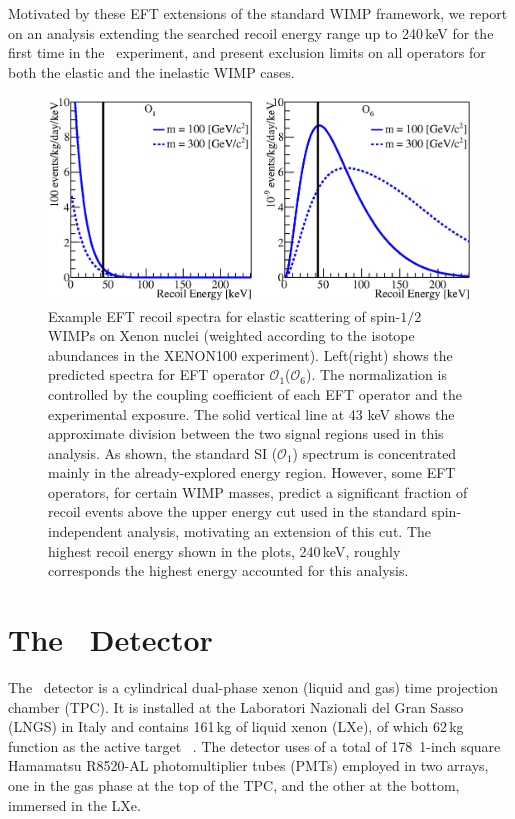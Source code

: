 Motivated by these EFT extensions of the standard WIMP framework, we report on an analysis extending the searched recoil energy range up to 240\,keV for the first time in the \Xehund\ experiment, and present exclusion limits on all operators for both the elastic and the inelastic WIMP cases.     


\begin{figure}[t!]
\centerline{\includegraphics[width=1.\linewidth]{Figures/drdeO1O6.eps}}
\caption{Example EFT recoil spectra for elastic scattering of spin-$1/2$ WIMPs on Xenon nuclei (weighted according to the isotope abundances in the XENON100 experiment). Left(right) shows the predicted spectra for EFT operator $\mathcal{O}_1$($\mathcal{O}_6$). The normalization is controlled by the coupling coefficient of each EFT operator and the experimental exposure. The solid vertical line at 43 keV shows the approximate division between the two signal regions used in this analysis. As shown, the standard SI ($\mathcal{O}_1$) spectrum is concentrated mainly in the already-explored energy region. However, some EFT operators, for certain WIMP masses, predict a significant fraction of recoil events above the upper energy cut used in the standard spin-independent analysis, motivating an extension of this cut. The highest recoil energy shown in the plots, 240\,keV, roughly corresponds the highest energy accounted for this analysis.}
\label{fig:dRdE}
\end{figure}

\section{The \Xehund\  Detector}
The \Xehund\ detector is a cylindrical %
dual-phase xenon (liquid and gas) time projection chamber (TPC). It is installed at the Laboratori Nazionali del Gran Sasso (LNGS) in Italy
and contains 161\,kg of liquid xenon (LXe), of which 62\,kg function as the active target ~\cite{xe100_instr2012}. 
The detector uses of a total of 178~1-inch square Hamamatsu R8520-AL photomultiplier tubes (PMTs) employed in two arrays, one in the gas phase at the top of the TPC, and the other at the bottom, immersed in the LXe. 

